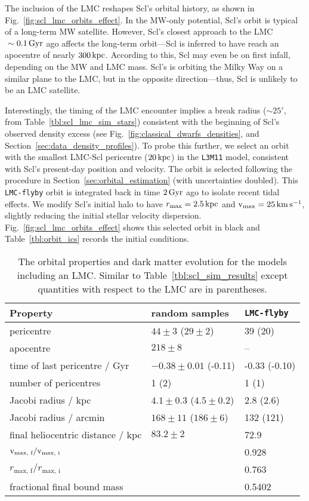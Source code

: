 The inclusion of the LMC reshapes Scl's orbital history, as shown in
Fig.~\ref{fig:scl_lmc_orbits_effect}. In the MW-only potential, Scl's
orbit is typical of a long-term MW satellite. However, Scl's closest
approach to the LMC \(~\sim0.1\,{\rm Gyr}\) ago affects the long-term
orbit---Scl is inferred to have reach an apocentre of nearly
\(300\,{\rm kpc}\). According to this, Scl may even be on first infall,
depending on the MW and LMC mass. Scl's is orbiting the Milky Way on a
similar plane to the LMC, but in the opposite direction---thus, Scl is
unlikely to be an LMC satellite.

Interestingly, the timing of the LMC encounter implies a break radius
(\(\sim 25'\), from Table~\ref{tbl:scl_lmc_sim_stars}) consistent with
the beginning of Scl's observed density excess (see
Fig.~\ref{fig:classical_dwarfs_densities}, and
Section~\ref{sec:data_density_profiles}). To probe this further, we
select an orbit with the smallest LMC-Scl pericentre (\(20\,{\rm kpc}\)) in
the \texttt{L3M11} model, consistent with Scl's present-day position and
velocity. The orbit is selected following the procedure in
Section~\ref{sec:orbital_estimation} (with uncertainties doubled). This
\texttt{LMC-flyby} orbit is integrated back in time \(2\,{\rm Gyr}\) ago to
isolate recent tidal effects. We modify Scl's initial halo to have
\(r_{\rm max} = 2.5\,{\rm kpc}\) and \({\rm v}_{\rm max} = 25\,{\rm km\,s^{-1}}\), slightly reducing the
initial stellar velocity dispersion.
Fig.~\ref{fig:scl_lmc_orbits_effect} shows this selected orbit in black
and Table~\ref{tbl:orbit_ics} records the initial conditions.

\begin{table*}[t]
\centering
\caption[Orbits and results for Sculptor in the MW+LMC potential.]{The orbital properties and dark matter evolution for the models including an LMC. Similar to Table \ref{tbl:scl_sim_results} except quantities with respect to the LMC are in parentheses. }
\label{tbl:scl_lmc_sims}
\begin{tabular}{lll}
\toprule
Property & random samples & \texttt{LMC-flyby}\\
\midrule
pericentre & $44\pm 3$ ($29 \pm 2$) & 39 (20)\\
apocentre & $218 \pm 8$ & –\\
time of last pericentre / Gyr & $-0.38\pm0.01$ (-0.11) & -0.33 (-0.10)\\
number of pericentres & 1 (2) & 1 (1)\\
Jacobi radius / kpc & $4.1\pm0.3$ ($4.5\pm0.2$) & 2.8 (2.6)\\
Jacobi radius / arcmin & $168 \pm 11$ ($186\pm6$) & 132 (121)\\
final heliocentric distance / kpc & $83.2\pm2$ & 72.9\\
${\rm v}_\textrm{max, f} / {\rm v}_\textrm{max, i}$ &  & 0.928\\
$r_\textrm{max, f} / r_\textrm{max, i}$ &  & 0.763\\
fractional final bound mass &  & 0.5402\\
\bottomrule
\end{tabular}
\end{table*}

